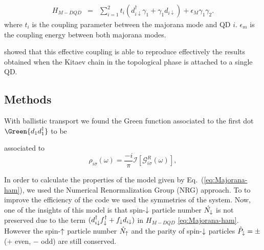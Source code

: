 \documentclass[showpacs,aps,prb,reprint,superscriptaddress]{revtex4-1}
\newcommand{\Jesus}[1]{\textcolor{red}{\fbox{Jesus} {\sl#1}}}
\begin{document}
\begin{eqnarray}
H_{M-DQD} & = &  \sum_{i=1}^2t_{i} \left(d_{i\downarrow}^{\dagger}\gamma_{1}+\gamma_{1}d_{i\downarrow}\right) + \epsilon_M \gamma_1\gamma_2. 
\label{eq:H_MDQD}
\end{eqnarray}
where $t_i$ is the coupling parameter between the majorana mode and QD $i$. $\epsilon_m$ is the coupling energy between both majorana modes.  







\citeauthor{ruiz-tijerina_interaction_2015}  showed that this effective coupling  is able to reproduce effectively the results obtained when the Kitaev chain in the topological phase is attached to a single QD.  \\
 
\subsection{Methods}
With ballistic transport we found the Green function associated to the first dot  $\Green{d_1d^\dagger_1}$  to be 



associated to
\begin{equation}
    \rho_{i\sigma}(\omega)= \frac{-i}{\pi}\mathcal{I}\left[ \mathcal{G}^R_{i\sigma}(\omega) \right],
    \label{eq:SpectralFunction}
\end{equation}



In order to calculate the properties of the model given by Eq.\ (\ref{eq:Majorana-ham}), we used the Numerical Renormalization Group (NRG) approach. \cite{wilson_renormalization_1975,sindel_numerical_2005,bulla_numerical_2008} 
 To to improve the efficiency of the code we used the symmetries of the system.  Now, one of the insights of this model is that spin-$\downarrow$ particle number $\hat{N_\downarrow}$ is not preserved due to the term $(d_{i\downarrow}^{\dagger}f^\dagger_{\downarrow} + 
f_{\downarrow}d_{i\downarrow})$ in $H_{M-DQD}$ \eqref{eq:Majorana-ham}. However the  spin-$\uparrow$ particle number $\hat{N}_\uparrow$ and the parity of spin-$\downarrow$ particles $\hat{P}_\downarrow = \pm $ ($+$ even, $-$ odd) are still conserved. \\
\end{document}

